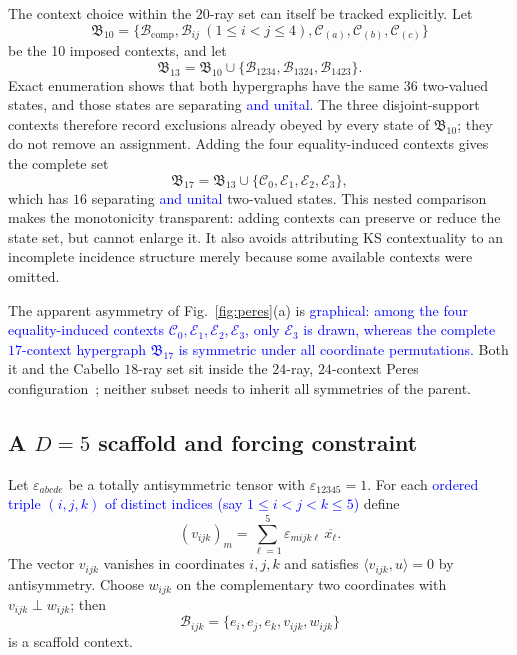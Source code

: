 \documentclass[%
  reprint,
  superscriptaddress,
  showkeys,
  amsmath,amssymb,
  aps,pra,
  longbibliography,
  floatfix,
  x11names
]{revtex4-2}
\DeclareRobustCommand{\chg}[1]{\textcolor{blue}{#1}}
\begin{document}
The context choice within the $20$-ray set can itself be tracked explicitly.  Let
\[
\mathfrak{B}_{10}=\{\mathcal{B}_{\mathrm{comp}},\mathcal{B}_{ij}\ (1\leq i<j\leq4),
\mathcal{C}_{(a)},\mathcal{C}_{(b)},\mathcal{C}_{(c)}\}
\]
be the 10 imposed contexts, and let
\[
\mathfrak{B}_{13}=\mathfrak{B}_{10}\cup
\{\mathcal{B}_{1234},\mathcal{B}_{1324},\mathcal{B}_{1423}\}.
\]
Exact enumeration shows that both hypergraphs have the same $36$ two-valued states, and those states are separating \chg{and unital}.  The three disjoint-support contexts therefore record exclusions already obeyed by every state of $\mathfrak{B}_{10}$; they do not remove an assignment.  Adding the four equality-induced contexts gives the complete set
\[
\mathfrak{B}_{17}=\mathfrak{B}_{13}\cup\{\mathcal{C}_0,\mathcal{E}_1,\mathcal{E}_2,\mathcal{E}_3\},
\]
which has $16$ separating \chg{and unital} two-valued states.  This nested comparison makes the monotonicity transparent: adding contexts can preserve or reduce the state set, but cannot enlarge it.  It also avoids attributing KS contextuality to an incomplete incidence structure merely because some available contexts were omitted.

The apparent asymmetry of Fig.~\ref{fig:peres}(a) is \chg{graphical: among the four equality-induced contexts $\mathcal{C}_0,\mathcal{E}_1,\mathcal{E}_2,\mathcal{E}_3$, only $\mathcal{E}_3$ is drawn, whereas the complete $17$-context hypergraph $\mathfrak{B}_{17}$ is symmetric under all coordinate permutations.}  Both it and the Cabello $18$-ray set sit inside the $24$-ray, $24$-context Peres configuration~\cite{Pavicic-2005,pavicic-2005csvcorri}; neither subset needs to
inherit all symmetries of the parent.


\subsection{A \texorpdfstring{$D=5$}{D=5} scaffold and forcing constraint}

Let $\varepsilon_{abcde}$ be a totally antisymmetric tensor
with $\varepsilon_{12345}=1$.  For each \chg{ordered triple $(i,j,k)$ of distinct indices (say $1\le i<j<k\le 5$)} define
\[
(v_{ijk})_m=\sum_{\ell=1}^5\varepsilon_{mijk\ell}\,\overline{x_\ell}.
\]
The vector $v_{ijk}$ vanishes in coordinates $i,j,k$ and satisfies $\langle v_{ijk},u\rangle=0$ by antisymmetry.  Choose $w_{ijk}$ on the complementary two coordinates with $v_{ijk}\perp w_{ijk}$; then
\[
\mathcal{B}_{ijk}=\{e_i,e_j,e_k,v_{ijk},w_{ijk}\}
\]
is a scaffold context.
\end{document}
